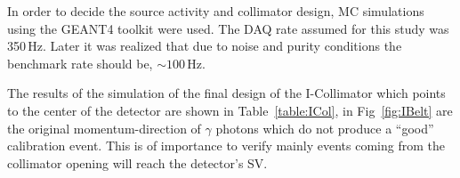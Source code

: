 In order to decide the source activity and collimator design, MC simulations using the GEANT4 toolkit were used. The DAQ rate assumed for this study was 350\,Hz. Later it was realized that due to noise and purity conditions the benchmark rate should be, $\sim100$\,Hz. 

The results of the simulation of the final design of the I-Collimator which points to the center of the detector are shown in Table~\ref{table:ICol}, in Fig~\ref{fig:IBelt} are the original momentum-direction of $\gamma$ photons which do not produce a ``good'' calibration event. This is of importance to verify mainly events coming from the collimator opening will reach the detector's SV.


\begin{table}
\begin{center}

\label{table:ICol}
\end{center}
\end{table}


